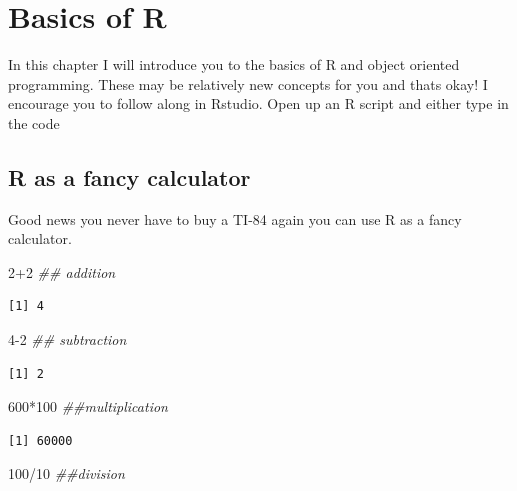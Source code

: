 \documentclass[
  letterpaper,
  DIV=11,
  numbers=noendperiod,
  oneside]{scrreprt}
\newenvironment{Shaded}{\begin{snugshade}}{\end{snugshade}}
\newcommand{\DecValTok}[1]{\textcolor[rgb]{0.68,0.00,0.00}{#1}}
\newcommand{\DocumentationTok}[1]{\textcolor[rgb]{0.37,0.37,0.37}{\textit{#1}}}
\newcommand{\SpecialCharTok}[1]{\textcolor[rgb]{0.37,0.37,0.37}{#1}}
\begin{document}
\hypertarget{basics-of-r}{%
\chapter{Basics of R}\label{basics-of-r}}

In this chapter I will introduce you to the basics of R and object
oriented programming. These may be relatively new concepts for you and
thats okay! I encourage you to follow along in Rstudio. Open up an R
script and either type in the code

\hypertarget{r-as-a-fancy-calculator}{%
\section{R as a fancy calculator}\label{r-as-a-fancy-calculator}}

Good news you never have to buy a TI-84 again you can use R as a fancy
calculator.

\begin{Shaded}
\begin{Highlighting}[]
\DecValTok{2}\SpecialCharTok{+}\DecValTok{2} \DocumentationTok{\#\# addition}
\end{Highlighting}
\end{Shaded}

\begin{verbatim}
[1] 4
\end{verbatim}

\begin{Shaded}
\begin{Highlighting}[]
\DecValTok{4{-}2} \DocumentationTok{\#\# subtraction}
\end{Highlighting}
\end{Shaded}

\begin{verbatim}
[1] 2
\end{verbatim}

\begin{Shaded}
\begin{Highlighting}[]
\DecValTok{600}\SpecialCharTok{*}\DecValTok{100} \DocumentationTok{\#\#multiplication}
\end{Highlighting}
\end{Shaded}

\begin{verbatim}
[1] 60000
\end{verbatim}

\begin{Shaded}
\begin{Highlighting}[]
\DecValTok{100}\SpecialCharTok{/}\DecValTok{10} \DocumentationTok{\#\#division}
\end{Highlighting}
\end{Shaded}
\end{document}
